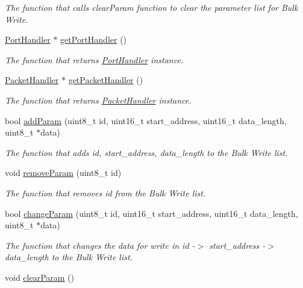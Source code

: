 \begin{DoxyCompactItemize}
\begin{DoxyCompactList}\small\item\em The function that calls clear\+Param function to clear the parameter list for Bulk Write. \end{DoxyCompactList}\item 
\hyperlink{classmercury_1_1_port_handler}{Port\+Handler} $\ast$ \hyperlink{classmercury_1_1_group_bulk_write_a2a2493c608b428de125c8bb9e4ceb2b8}{get\+Port\+Handler} ()
\begin{DoxyCompactList}\small\item\em The function that returns \hyperlink{classmercury_1_1_port_handler}{Port\+Handler} instance. \end{DoxyCompactList}\item 
\hyperlink{classmercury_1_1_packet_handler}{Packet\+Handler} $\ast$ \hyperlink{classmercury_1_1_group_bulk_write_aa2759c3d49f1ea057dcdf640c51dcd19}{get\+Packet\+Handler} ()
\begin{DoxyCompactList}\small\item\em The function that returns \hyperlink{classmercury_1_1_packet_handler}{Packet\+Handler} instance. \end{DoxyCompactList}\item 
bool \hyperlink{classmercury_1_1_group_bulk_write_abdf0b366f7e1b18c0619a6aff729913c}{add\+Param} (uint8\+\_\+t id, uint16\+\_\+t start\+\_\+address, uint16\+\_\+t data\+\_\+length, uint8\+\_\+t $\ast$data)
\begin{DoxyCompactList}\small\item\em The function that adds id, start\+\_\+address, data\+\_\+length to the Bulk Write list. \end{DoxyCompactList}\item 
void \hyperlink{classmercury_1_1_group_bulk_write_a2bc7007a74d27ce95578de1368cf8304}{remove\+Param} (uint8\+\_\+t id)
\begin{DoxyCompactList}\small\item\em The function that removes id from the Bulk Write list. \end{DoxyCompactList}\item 
bool \hyperlink{classmercury_1_1_group_bulk_write_a72819c9a82f4e9fd10897595a6a299a3}{change\+Param} (uint8\+\_\+t id, uint16\+\_\+t start\+\_\+address, uint16\+\_\+t data\+\_\+length, uint8\+\_\+t $\ast$data)
\begin{DoxyCompactList}\small\item\em The function that changes the data for write in id -\/$>$ start\+\_\+address -\/$>$ data\+\_\+length to the Bulk Write list. \end{DoxyCompactList}\item 
void \hyperlink{classmercury_1_1_group_bulk_write_a2f0a92ae1bd8d024a8804b054dbeb077}{clear\+Param} ()\hypertarget{classmercury_1_1_group_bulk_write_a2f0a92ae1bd8d024a8804b054dbeb077}{}\label{classmercury_1_1_group_bulk_write_a2f0a92ae1bd8d024a8804b054dbeb077}


\end{DoxyCompactItemize}
